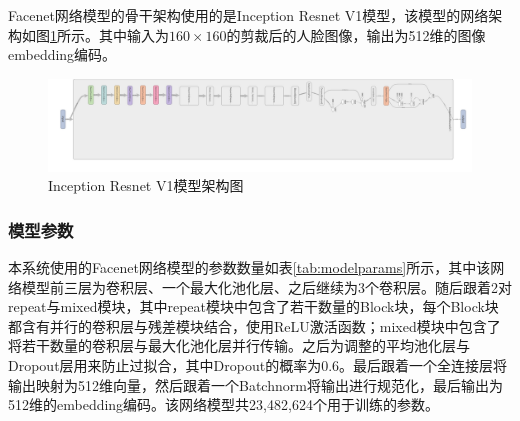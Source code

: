 Facenet网络模型的骨干架构使用的是Inception Resnet V1模型，该模型的网络架构如图\ref{fig:resnetarc}所示。其中输入为$160\times 160$的剪裁后的人脸图像，输出为512维的图像embedding编码。

\begin{figure}[H]
    \centering
    \includegraphics[width=\textwidth]{figures/5modelarc.png}
    \caption{Inception Resnet V1模型架构图}
    \label{fig:resnetarc}
\end{figure}

\subsubsection{模型参数}

本系统使用的Facenet网络模型的参数数量如表\ref{tab:modelparams}所示，其中该网络模型前三层为卷积层、一个最大化池化层、之后继续为3个卷积层。随后跟着2对repeat与mixed模块，其中repeat模块中包含了若干数量的Block块，每个Block块都含有并行的卷积层与残差模块结合，使用ReLU激活函数；mixed模块中包含了将若干数量的卷积层与最大化池化层并行传输。之后为调整的平均池化层与Dropout层用来防止过拟合，其中Dropout的概率为0.6。最后跟着一个全连接层将输出映射为512维向量，然后跟着一个Batchnorm将输出进行规范化，最后输出为512维的embedding编码。该网络模型共23,482,624个用于训练的参数。

